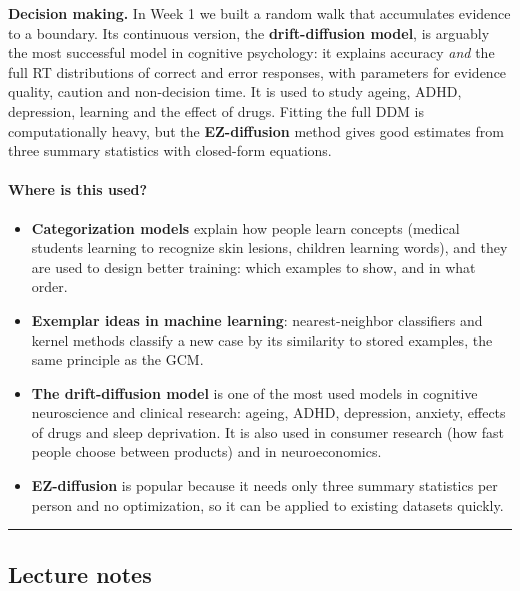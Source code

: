\textbf{Decision making.} In Week 1 we built a random walk that
accumulates evidence to a boundary. Its continuous version, the
\textbf{drift-diffusion model}, is arguably the most successful model in
cognitive psychology: it explains accuracy \emph{and} the full RT
distributions of correct and error responses, with parameters for
evidence quality, caution and non-decision time. It is used to study
ageing, ADHD, depression, learning and the effect of drugs. Fitting the
full DDM is computationally heavy, but the \textbf{EZ-diffusion} method
gives good estimates from three summary statistics with closed-form
equations.

\paragraph{Where is this used?}

\begin{itemize}
\tightlist
\item
  \textbf{Categorization models} explain how people learn concepts
  (medical students learning to recognize skin lesions, children
  learning words), and they are used to design better training: which
  examples to show, and in what order.
\item
  \textbf{Exemplar ideas in machine learning}: nearest-neighbor
  classifiers and kernel methods classify a new case by its similarity
  to stored examples, the same principle as the GCM.
\item
  \textbf{The drift-diffusion model} is one of the most used models in
  cognitive neuroscience and clinical research: ageing, ADHD,
  depression, anxiety, effects of drugs and sleep deprivation. It is
  also used in consumer research (how fast people choose between
  products) and in neuroeconomics.
\item
  \textbf{EZ-diffusion} is popular because it needs only three summary
  statistics per person and no optimization, so it can be applied to
  existing datasets quickly.
\end{itemize}

\begin{center}\rule{0.5\linewidth}{0.5pt}\end{center}


\subsection{Lecture notes}

